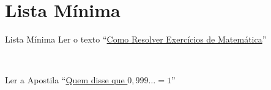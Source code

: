\documentclass[fleqn,utf8,aspectratio=169,12pt]{beamer}
\begin{document}
\section{Lista Mínima}

\begin{frame}{Lista Mínima}
  Ler o texto
  ``\href{https://drive.google.com/file/d/1iUuy68VWqKabrV7JxTwlyOgr59cA9G2r/view?usp=sharing}%
  {Como Resolver Exercícios de Matemática}''

  ~

  Ler a Apostila
  ``\href{https://material-didatico.github.io/pages/infinito/}%
  {Quem disse que $0,999\dots=1$}''
\end{frame}

\end{document}
